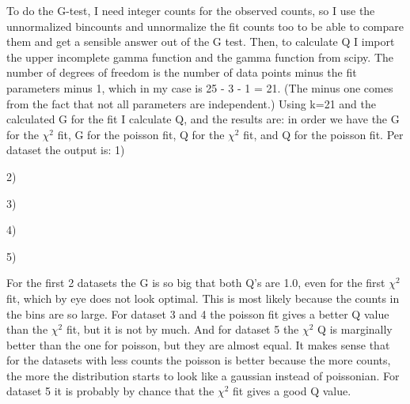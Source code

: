 To do the G-test, I need integer counts for the observed counts, so I use the unnormalized bincounts and unnormalize the fit counts too to be able to compare them and get a sensible answer out of the G test.
Then, to calculate Q I import the upper incomplete gamma function and the gamma function from scipy. The number of degrees of freedom is the number of data points minus the fit parameters minus 1, which in my case is 25 - 3 - 1 = 21. (The minus one comes from the fact that not all parameters are independent.)
Using k=21 and the calculated G for the fit I calculate Q, and the results are:
in order we have the G for the $\chi^2$ fit, G for the poisson fit, Q for the $\chi^2$ fit, and Q for the poisson fit. Per dataset the output is: 
1)

2)

3)

4)

5)

For the first 2 datasets the G is so big that both Q's are 1.0, even for the first $\chi^2$ fit, which by eye does not look optimal. This is most likely because the counts in the bins are so large. 
For dataset 3 and 4 the poisson fit gives a better Q value than the $\chi^2$ fit, but it is not by much. 
And for dataset 5 the $\chi^2$ Q is marginally better than the one for poisson, but they are almost equal. 
It makes sense that for the datasets with less counts the poisson is better because the more counts, the more the distribution starts to look like a gaussian instead of poissonian. For dataset 5 it is probably by chance that the $\chi^2$ fit gives a good Q value. 

